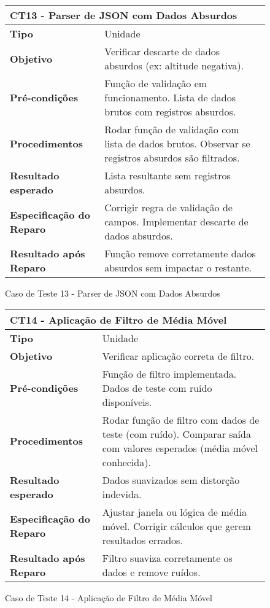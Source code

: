 \begin{figure}[H]
    \centering
\begin{longtable}{|p{}|p{}|}
\hline
\multicolumn{2}{|l|}{\textbf{CT13 - Parser de JSON com Dados Absurdos}} \\
\hline
\textbf{Tipo} & Unidade \\
\hline
\textbf{Objetivo} & Verificar descarte de dados absurdos (ex: altitude negativa). \\
\hline
\textbf{Pré-condições} & Função de validação em funcionamento.  Lista de dados brutos com registros absurdos. \\
\hline
\textbf{Procedimentos} & Rodar função de validação com lista de dados brutos.  Observar se registros absurdos são filtrados. \\
\hline
\textbf{Resultado esperado} & Lista resultante sem registros absurdos. \\
\hline
\textbf{Especificação do Reparo} & Corrigir regra de validação de campos.  Implementar descarte de dados absurdos. \\
\hline
\textbf{Resultado após Reparo} & Função remove corretamente dados absurdos sem impactar o restante. \\
\hline
\end{longtable}
\caption{Caso de Teste 13 - Parser de JSON com Dados Absurdos}
\label{fig_ct27_parser_json_dados_absurdos}
\end{figure}

\begin{figure}[H]
    \centering
\begin{longtable}{|p{}|p{}|}
\hline
\multicolumn{2}{|l|}{\textbf{CT14 - Aplicação de Filtro de Média Móvel}} \\
\hline
\textbf{Tipo} & Unidade \\
\hline
\textbf{Objetivo} & Verificar aplicação correta de filtro. \\
\hline
\textbf{Pré-condições} & Função de filtro implementada.  Dados de teste com ruído disponíveis.  \\
\hline
\textbf{Procedimentos} & Rodar função de filtro com dados de teste (com ruído).  Comparar saída com valores esperados (média móvel conhecida).  \\
\hline
\textbf{Resultado esperado} & Dados suavizados sem distorção indevida. \\
\hline
\textbf{Especificação do Reparo} & Ajustar janela ou lógica de média móvel.  Corrigir cálculos que gerem resultados errados. \\
\hline
\textbf{Resultado após Reparo} & Filtro suaviza corretamente os dados e remove ruídos. \\
\hline
\end{longtable}
\caption{Caso de Teste 14 - Aplicação de Filtro de Média Móvel}
\label{fig_ct11_filtro_media_movel}
\end{figure}

